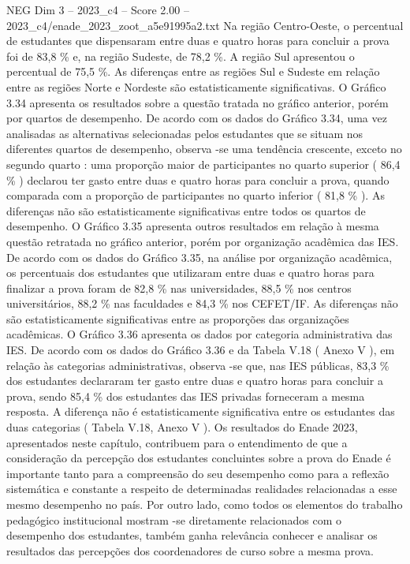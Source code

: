 \begin{textsample}{NEG Dim 3 – 2023\_c4 – Score 2.00 – 2023\_c4/enade\_2023\_zoot\_a5e91995a2.txt}
Na região Centro-Oeste, o percentual de estudantes que dispensaram entre duas e quatro horas para concluir a prova foi de 83,8 \% e, na região Sudeste, de 78,2 \%.
A região Sul apresentou o percentual de 75,5 \%.
As diferenças entre as regiões Sul e Sudeste em relação entre as regiões Norte e Nordeste são estatisticamente significativas.
O Gráfico 3.34 apresenta os resultados sobre a questão tratada no gráfico anterior, porém por quartos de desempenho.
De acordo com os dados do Gráfico 3.34, uma vez analisadas as alternativas selecionadas pelos estudantes que se situam nos diferentes quartos de desempenho, observa -se uma tendência crescente, exceto no segundo quarto : uma proporção maior de participantes no quarto superior ( 86,4 \% ) declarou ter gasto entre duas e quatro horas para concluir a prova, quando comparada com a proporção de participantes no quarto inferior ( 81,8 \% ).
As diferenças não são estatisticamente significativas entre todos os quartos de desempenho.
O Gráfico 3.35 apresenta outros resultados em relação à mesma questão retratada no gráfico anterior, porém por organização acadêmica das IES.
De acordo com os dados do Gráfico 3.35, na análise por organização acadêmica, os percentuais dos estudantes que utilizaram entre duas e quatro horas para finalizar a prova foram de 82,8 \% nas universidades, 88,5 \% nos centros universitários, 88,2 \% nas faculdades e 84,3 \% nos CEFET/IF.
As diferenças não são estatisticamente significativas entre as proporções das organizações acadêmicas.
O Gráfico 3.36 apresenta os dados por categoria administrativa das IES.
De acordo com os dados do Gráfico 3.36 e da Tabela V.18 ( Anexo V ), em relação às categorias administrativas, observa -se que, nas IES públicas, 83,3 \% dos estudantes declararam ter gasto entre duas e quatro horas para concluir a prova, sendo 85,4 \% dos estudantes das IES privadas forneceram a mesma resposta.
A diferença não é estatisticamente significativa entre os estudantes das duas categorias ( Tabela V.18, Anexo V ).
Os resultados do Enade 2023, apresentados neste capítulo, contribuem para o entendimento de que a consideração da percepção dos estudantes concluintes sobre a prova do Enade é importante tanto para a compreensão do seu desempenho como para a reflexão sistemática e constante a respeito de determinadas realidades relacionadas a esse mesmo desempenho no país.
Por outro lado, como todos os elementos do trabalho pedagógico institucional mostram -se diretamente relacionados com o desempenho dos estudantes, também ganha relevância conhecer e analisar os resultados das percepções dos coordenadores de curso sobre a mesma prova.

\end{textsample}

